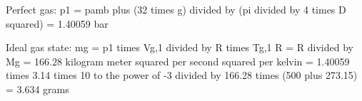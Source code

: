 Perfect gas:  
p1 = pamb plus (32 times g) divided by (pi divided by 4 times D squared)  
= 1.40059 bar  

Ideal gas state:  
mg = p1 times Vg,1 divided by R times Tg,1  
R = R divided by Mg = 166.28 kilogram meter squared per second squared per kelvin  
= 1.40059 times 3.14 times 10 to the power of -3 divided by 166.28 times (500 plus 273.15)  
= 3.634 grams